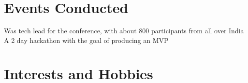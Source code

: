 \documentclass[11pt,a4paper]{moderncv}
\begin{document}
\section{Events Conducted}

{Was tech lead for the conference, with about 800 participants from all over India}
{A 2 day hackathon with the goal of producing an MVP}


\section{Interests and Hobbies}


\end{document}
